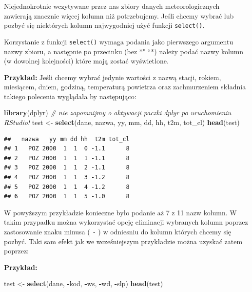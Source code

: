 \documentclass[]{book}
\newenvironment{Shaded}{\begin{snugshade}}{\end{snugshade}}
\newcommand{\KeywordTok}[1]{\textcolor[rgb]{0.13,0.29,0.53}{\textbf{#1}}}
\newcommand{\StringTok}[1]{\textcolor[rgb]{0.31,0.60,0.02}{#1}}
\newcommand{\CommentTok}[1]{\textcolor[rgb]{0.56,0.35,0.01}{\textit{#1}}}
\newcommand{\OperatorTok}[1]{\textcolor[rgb]{0.81,0.36,0.00}{\textbf{#1}}}
\newcommand{\NormalTok}[1]{#1}
\theoremstyle{definition}
\theoremstyle{definition}
\theoremstyle{definition}
\theoremstyle{remark}
\begin{document}
Niejednokrotnie wczytywane przez nas zbiory danych meteorologicznych
zawierają znacznie więcej kolumn niż potrzebujemy. Jeśli chcemy wybrać
lub pozbyć się niektórych kolumn najwygodniej użyć funkcji
\texttt{select()}.

Korzystanie z funkcji \texttt{select()} wymaga podania jako pierwszego
argumentu nazwy zbioru, a następnie po przecinku (bez *" ``*) należy
podać nazwy kolumn (w dowolnej kolejności) które mają zostać
wyświetlone.

\textbf{Przykład:} Jeśli chcemy wybrać jedynie wartości z nazwą stacji,
rokiem, miesiącem, dniem, godziną, temperaturą powietrza oraz
zachmurzeniem składnia takiego polecenia wyglądała by następująco:

\begin{Shaded}
\begin{Highlighting}[]
\KeywordTok{library}\NormalTok{(dplyr) }\CommentTok{# nie zapomnijmy o aktywacji paczki dplyr po uruchomieniu RStudio!}
\NormalTok{test <-}\StringTok{ }\KeywordTok{select}\NormalTok{(dane, nazwa, yy, mm, dd, hh, t2m, tot_cl) }
\KeywordTok{head}\NormalTok{(test)}
\end{Highlighting}
\end{Shaded}

\begin{verbatim}
##   nazwa   yy mm dd hh  t2m tot_cl
## 1   POZ 2000  1  1  0 -1.1      8
## 2   POZ 2000  1  1  1 -1.1      8
## 3   POZ 2000  1  1  2 -1.1      8
## 4   POZ 2000  1  1  3 -1.2      8
## 5   POZ 2000  1  1  4 -1.2      8
## 6   POZ 2000  1  1  5 -1.0      8
\end{verbatim}

W powyższym przykładzie konieczne było podanie aż 7 z 11 nazw kolumn. W
takim przypadku można wykorzystać opcję eliminacji wybranych kolumn
poprzez zastosowanie znaku minusa ( \texttt{-} ) w odniesniu do kolumn
których chcemy się pozbyć. Taki sam efekt jak we wcześniejszym
przykładzie można uzyskać zatem poprzez:

\textbf{Przykład:}

\begin{Shaded}
\begin{Highlighting}[]
\NormalTok{test <-}\StringTok{ }\KeywordTok{select}\NormalTok{(dane, }\OperatorTok{-}\NormalTok{kod, }\OperatorTok{-}\NormalTok{ws, }\OperatorTok{-}\NormalTok{wd, }\OperatorTok{-}\NormalTok{slp)}
\KeywordTok{head}\NormalTok{(test)}
\end{Highlighting}
\end{Shaded}
\end{document}
